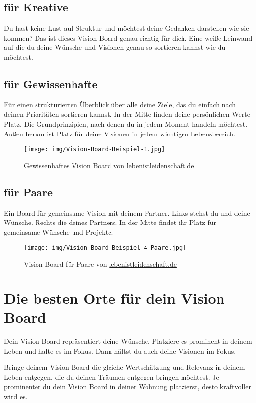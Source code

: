 \documentclass[../Lebensziel.tex]{subfiles}
\begin{document}
\subsection{für Kreative}
Du hast keine Lust auf Struktur und möchtest deine Gedanken darstellen wie sie kommen? Das ist dieses Vision Board genau richtig für dich. Eine weiße Leinwand auf die du deine Wünsche und Visionen genau so sortieren kannst wie du möchtest.

\subsection{für Gewissenhafte}
Für einen strukturierten Überblick über alle deine Ziele, das du einfach nach deinen Prioritäten sortieren kannst.
In der Mitte finden deine persönlichen Werte Platz. Die Grundprinzipien, nach denen du in jedem Moment handeln möchtest.
Außen herum ist Platz für deine Visionen in jedem wichtigen Lebensbereich.

\begin{figure}[h]
    \centering
    \texttt{[image: img/Vision-Board-Beispiel-1.jpg]}
    \caption{Gewissenhaftes Vision Board von \href{https://lebenistleidenschaft.de/vision-board-erstellen/}{lebenistleidenschaft.de} }
\end{figure}

\subsection{für Paare}
Ein Board für gemeinsame Vision mit deinem Partner.
Links stehst du und deine Wünsche. Rechts die deines Partners.
In der Mitte findet ihr Platz für gemeinsame Wünsche und Projekte.

\begin{figure}[h]
    \centering
    \texttt{[image: img/Vision-Board-Beispiel-4-Paare.jpg]}
    \caption{Vision Board für Paare von \href{https://lebenistleidenschaft.de/vision-board-erstellen/}{lebenistleidenschaft.de} }
\end{figure}


\section{Die besten Orte für dein Vision Board}
Dein Vision Board repräsentiert deine Wünsche.
Platziere es prominent in deinem Leben und halte es im Fokus.
Dann hältst du auch deine Visionen im Fokus.

Bringe deinem Vision Board die gleiche Wertschätzung und Relevanz in deinem Leben entgegen, die du deinen Träumen entgegen bringen möchtest. Je prominenter du dein Vision Board in deiner Wohnung platzierst, desto kraftvoller wird es.
\end{document}
